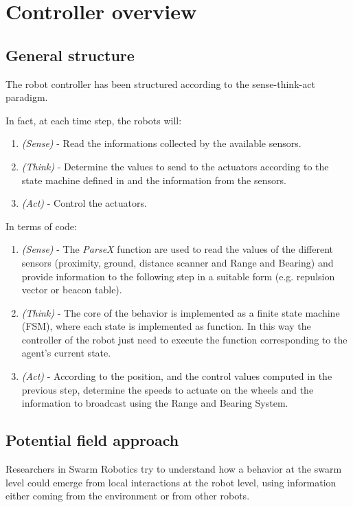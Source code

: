 \section{Controller overview}
\subsection{General structure}
The robot controller has been structured according to the sense-think-act paradigm.

In fact, at each time step, the robots will:
\begin{enumerate}
  \item \emph{(Sense)} - Read the informations collected by the available sensors.
  \item \emph{(Think)} - Determine the values to send to the actuators according to the state machine defined in  and the information from the sensors.
  \item \emph{(Act)} - Control the actuators.
\end{enumerate}

In terms of code:
\begin{enumerate}
  \item \emph{(Sense)} - The \emph{ParseX} function are used to read the values of the different sensors (proximity, ground, distance scanner and Range and Bearing) and provide information to the following step in a suitable form (e.g. repulsion vector or beacon table).
  \item \emph{(Think)} - The core of the behavior is implemented as a finite state machine (FSM), where each state is implemented as function.
  In this way the controller of the robot just need to execute the function corresponding to the agent's current state.
  \item \emph{(Act)} - According to the position, and the control values computed in the previous step, determine the speeds to actuate on the wheels and the information to broadcast using 
  the Range and Bearing System.
\end{enumerate}

\subsection{Potential field approach}
Researchers in Swarm Robotics try to understand how a behavior at the swarm level could emerge from local interactions at the robot level, using information either coming from the environment or from other robots.

